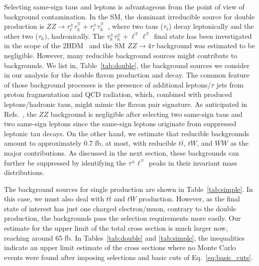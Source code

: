 \documentclass[prd,amsfonts,onecolumn,superscriptaddress,aps,nofootinbib,11pt]{revtex4-1}
\begin{document}
%
 Selecting same-sign taus and leptons is advantageous from the point of view of background contamination. In the SM, the dominant irreducible source for double production is $ZZ\to \tau_\ell^\pm\tau_h^\mp+\tau_\ell^\pm\tau_h^\mp$~, where two taus ($\tau_\ell$) decay leptonically and the other two ($\tau_h)$, hadronically.   The $\tau_h^\pm\tau_h^\pm+\ell^\mp\ell^\mp$ final state has been investigated in the scope of the 2HDM~\cite{Iguro:2019sly,Blanke:2022kpi} and the SM $ZZ\to 4\tau$ background was estimated to be negligible. However, many reducible background sources might contribute to backgrounds. We list in, Table~\ref{tab:double}, the background sources we consider in our analysis for the double flavon production and decay. The common feature of those background processes is the presence of additional leptons/$\tau$ jets from proton fragmentation and QCD radiation, which, combined with produced leptons/hadronic taus, might mimic the flavon pair signature. As anticipated in Refs.~\cite{Iguro:2019sly,Blanke:2022kpi}, the $ZZ$ background is negligible after selecting two same-sign taus and two same-sign leptons since the same-sign leptons originate from suppressed leptonic tau decays. On the other hand, we estimate that reducible backgrounds amount to approximately 0.7 fb, at most, with reducible $t\bar{t}$, $tW$, and $WW$ as the major contributions. As discussed in the next section, these backgrounds can further be suppressed by identifying the $\tau^\pm\ell^\mp$ peaks in their invariant mass distributions.

The background sources for single production are shown in Table~\ref{tab:simple}. In this case, we must also deal with $t\bar{t}$ and $tW$ production. However, as the final state of interest has just one charged electron/muon, contrary to the double production, the backgrounds pass the selection requirements more easily. Our estimate for the upper limit of the total cross section is much larger now, reaching around 65 fb. In Tables~\ref{tab:double} and \ref{tab:simple}, the inequalities indicate an upper limit estimate of the cross sections where no Monte Carlo events were found after imposing selections and basic cuts of Eq.~\eqref{eq:basic_cuts}.
\end{document}
